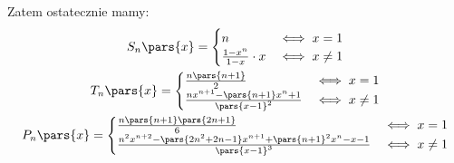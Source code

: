 Zatem ostatecznie mamy:
\begin{gather*}
    S_n\pars{x} = \begin{cases}
        n &\iff x = 1\\
        \frac{1 - x^n}{1 - x} \cdot x &\iff x \neq 1
    \end{cases}\\
    T_n\pars{x} = \begin{cases}
        \frac{n\pars{n + 1}}{2} &\iff x = 1\\
        \frac{nx^{n + 1} - \pars{n + 1}x^n + 1}{\pars{x - 1}^2} &\iff x \neq 1
    \end{cases}\\
    P_n\pars{x} = \begin{cases}
        \frac{n\pars{n + 1}\pars{2n + 1}}{6} &\iff x = 1\\
        \frac{n^2x^{n + 2} - \pars{2n^2 + 2n - 1}x^{n + 1} + \pars{n + 1}^2x^n - x - 1}{\pars{x - 1}^3} &\iff x \neq 1
    \end{cases}
\end{gather*}
